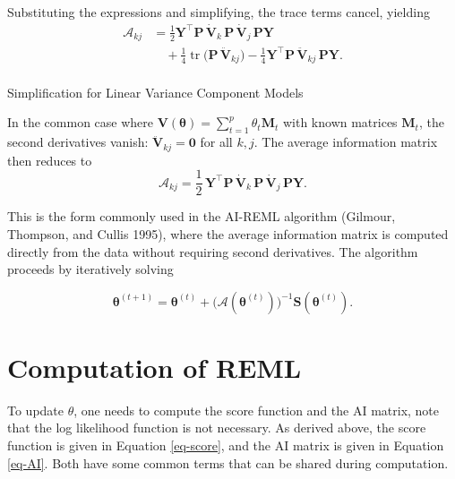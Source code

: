 \documentclass[
  letterpaper,
  DIV=11,
  numbers=noendperiod]{scrartcl}
\makeatletter
\let\oldparagraph\paragraph
\renewcommand{\paragraph}{
    \@ifstar
      \xxxParagraphStar
      \xxxParagraphNoStar
  }
\newcommand{\xxxParagraphStar}[1]{\oldparagraph*{#1}\mbox{}}
\newcommand{\xxxParagraphNoStar}[1]{\oldparagraph{#1}\mbox{}}
\makeatother
\begin{document}
Substituting the expressions and simplifying, the trace terms cancel,
yielding \begin{align}
\mathcal{A}_{kj} &= \frac12 \symbf{Y}^\top \symbf{P}\,\dot{\symbf{V}}_k\,\symbf{P}\,\dot{\symbf{V}}_j\,\symbf{P} \symbf{Y} \\
&\quad + \frac14 \operatorname{tr}\!\big( \symbf{P}\,\ddot{\symbf{V}}_{kj} \big)
- \frac14 \symbf{Y}^\top \symbf{P}\,\ddot{\symbf{V}}_{kj}\,\symbf{P}\symbf{Y}.
\end{align}

\paragraph{Simplification for Linear Variance Component
Models}\label{simplification-for-linear-variance-component-models}

In the common case where
\(\symbf{V}(\symbf{\theta}) = \sum_{t=1}^p \theta_t \symbf{M}_t\) with
known matrices \(\symbf{M}_t\), the second derivatives vanish:
\(\ddot{\symbf{V}}_{kj} = \symbf{0}\) for all \(k,j\). The average
information matrix then reduces to \begin{equation}
\label{eq-AI}
\boxed{
\mathcal{A}_{kj} = \frac12 \,\symbf{Y}^\top \symbf{P}\,\dot{\symbf{V}}_k\,\symbf{P}\,\dot{\symbf{V}}_j\,\symbf{P} \symbf{Y}
}.
\end{equation}

This is the form commonly used in the AI-REML algorithm (Gilmour,
Thompson, and Cullis 1995), where the average information matrix is
computed directly from the data without requiring second derivatives.
The algorithm proceeds by iteratively solving

\begin{equation}
\symbf{\theta}^{(t+1)} = \symbf{\theta}^{(t)} + \big( \mathcal{A}(\symbf{\theta}^{(t)}) \big)^{-1} \symbf{S}(\symbf{\theta}^{(t)}).
\end{equation}

\section{Computation of REML}\label{computation-of-reml}

To update \(\theta\), one needs to compute the score function and the AI
matrix, note that the log likelihood function is not necessary. As
derived above, the score function is given in Equation \eqref{eq-score},
and the AI matrix is given in Equation \eqref{eq-AI}. Both have some
common terms that can be shared during computation.
\end{document}
